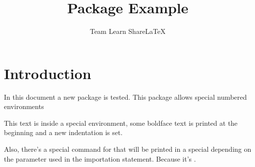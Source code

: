 \documentclass{article}
\title{Package Example}
\author{Team Learn ShareLaTeX}
\date{ }
\begin{document}
\maketitle

\section{Introduction}
In this document a new package is tested. This package allows special numbered environments

\begin{example}
This text is inside a special environment, some boldface text is printed
at the beginning and a new indentation is set.
\end{example}

Also, there's a special command for  that will be printed in a special  depending on the parameter used in the  importation statement. Because it's .

\printindex
\end{document}
